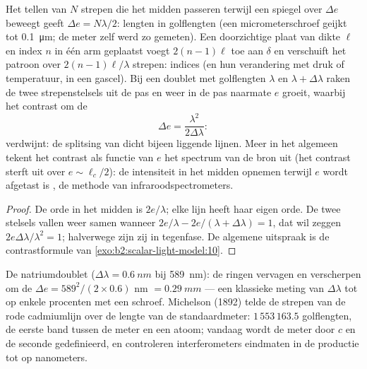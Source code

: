 \begin{proposition}\label{prop:b2:michelson:measure}
Het tellen van $N$ strepen die het midden passeren terwijl een spiegel over
$\Delta e$ beweegt
geeft $\Delta e = N\lambda/2$: lengten in golflengten (een micrometerschroef
geijkt tot \qty{0.1}{\micro m}; de meter zelf werd zo gemeten). Een
doorzichtige plaat van dikte $\ell$ en index $n$ in één arm geplaatst
voegt $2(n - 1)\ell$ toe aan $\delta$ en verschuift het patroon over
$2(n - 1)\ell/\lambda$
strepen: indices (en hun verandering met druk of temperatuur,
in een gascel). Bij een doublet met golflengten $\lambda$ en
$\lambda + \Delta\lambda$ raken de
twee strepenstelsels uit de pas en weer in de pas naarmate $e$ groeit, waarbij het
contrast om de
\[
\Delta e = \frac{\lambda^2}{2\Delta\lambda} :
\]
verdwijnt: de splitsing van dicht bijeen liggende lijnen. Meer in het
algemeen tekent het contrast als
functie van $e$ het spectrum van de bron uit (het contrast
sterft uit over $e \sim \ell_c/2$): de intensiteit in het midden opnemen terwijl
$e$ wordt afgetast is \emph{}, de methode van
infraroodspectrometers.
\end{proposition}

\begin{proof}
De orde in het midden is $2e/\lambda$; elke lijn heeft haar eigen orde. De twee
stelsels vallen weer samen wanneer
$2e/\lambda - 2e/(\lambda + \Delta\lambda) = 1$, dat wil zeggen
$2e\Delta\lambda
/\lambda^2 = 1$; halverwege zijn zij in tegenfase. De
algemene uitspraak is
de contrastformule van \cref{exo:b2:scalar-light-model:10}.
\end{proof}

\begin{example}\label{ex:b2:michelson:sodium}
De natriumdoublet ($\Delta\lambda = \qty{0.6}{nm}$ bij \qty{589}{nm}): de
ringen vervagen en
verscherpen om de $\Delta e = 589^2/(2 \times 0.6)$ nm $= \qty{0.29}{mm}$
--- een klassieke
meting van $\Delta\lambda$ tot op enkele procenten met een schroef. Michelson (1892)
telde de strepen van de rode cadmiumlijn over de lengte van de
standaardmeter: $1\,553\,163.5$ golflengten, de eerste band tussen de
meter en een atoom; vandaag wordt de meter door $c$ en de seconde
gedefinieerd, en controleren interferometers eindmaten in de productie tot op
nanometers.
\end{example}

